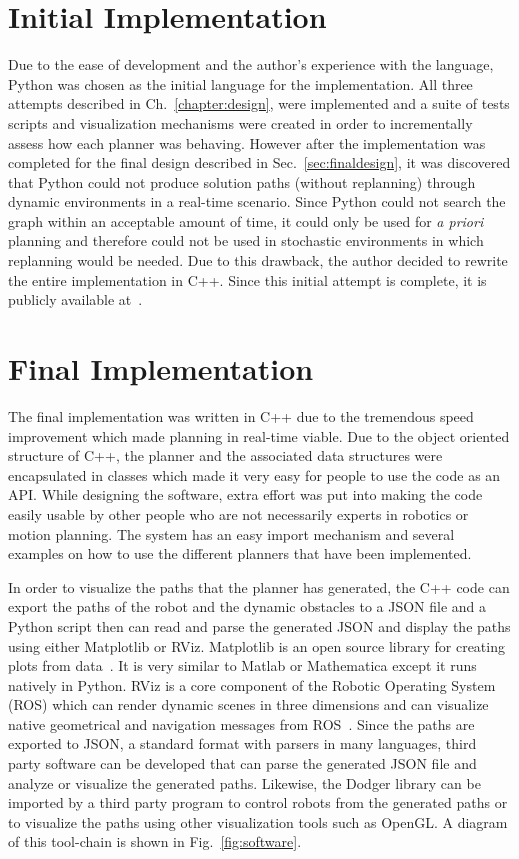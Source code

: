 \section{Initial Implementation}

Due to the ease of development and the author's experience with the language,
Python was chosen as the initial language for the implementation. All three
attempts described in Ch.~\ref{chapter:design}, were implemented and a suite of
tests scripts and visualization mechanisms were created in order to
incrementally assess how each planner was behaving. However after the
implementation was completed for the final design described in
Sec.~\ref{sec:finaldesign}, it was discovered that Python could not produce
solution paths (without replanning) through dynamic environments in a real-time
scenario. Since Python could not search the graph within an acceptable amount
of time, it could only be used for \emph{a priori} planning and therefore could
not be used in stochastic environments in which replanning would be needed. Due
to this drawback, the author decided to rewrite the entire implementation in
C++.  Since this initial attempt is complete, it is publicly available
at~\cite{racer}.

\section{Final Implementation}

The final implementation was written in C++ due to the tremendous speed
improvement which made planning in real-time viable. Due to the object oriented
structure of C++, the planner and the associated data structures were
encapsulated in classes which made it very easy for people to use the code as
an API. While designing the software, extra effort was put into making the code
easily usable by other people who are not necessarily experts in robotics or
motion planning.  The system has an easy import mechanism and several examples
on how to use the different planners that have been implemented.

In order to visualize the paths that the planner has generated, the C++ code
can export the paths of the robot and the dynamic obstacles to a JSON file and
a Python script then can read and parse the generated JSON and display the
paths using either Matplotlib or RViz. Matplotlib is an open source library for
creating plots from data~\cite{matplotlib}. It is very similar to Matlab or
Mathematica except it runs natively in Python. RViz is a core component of the
Robotic Operating System (ROS) which can render dynamic scenes in three
dimensions and can visualize native geometrical and navigation messages from
ROS~\cite{ros}.  Since the paths are exported to JSON, a standard format with
parsers in many languages, third party software can be developed that can parse
the generated JSON file and analyze or visualize the generated paths.
Likewise, the Dodger library can be imported by a third party program to
control robots from the generated paths or to visualize the paths using other
visualization tools such as OpenGL. A diagram of this tool-chain is shown in
Fig.~\ref{fig:software}.

